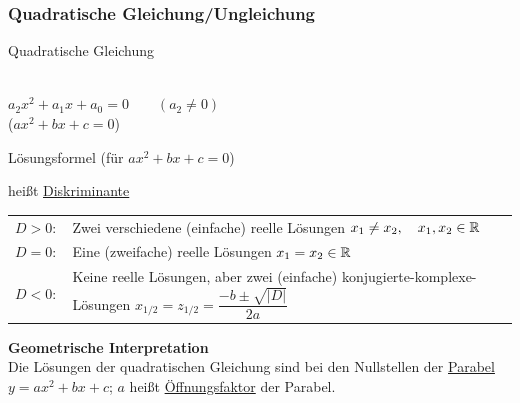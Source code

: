 \subsubsection{Quadratische Gleichung/Ungleichung}
\begin{enumerate}[A)]
	{\bf \item Quadratische Gleichung}\\
	$a_2x^2+a_1x+a_0=0 \qquad(a_2\ne0)$\\
	($ax^2+bx+c=0$)
	
	Lösungsformel (für $ax^2+bx+c=0$)
	
	
	 heißt \ul{Diskriminante}
	
	\vspace{1cm}
	\begin{longtable}{ll}
		\vspace{1cm}
		$D>0:$ & \parbox{\linewidth-3cm}{Zwei verschiedene (einfache) reelle Lösungen\\
			$x_1\ne x_2,\quad x_1,x_2\in\mathbb{R}$} \\
		\vspace{1cm}
		$D=0:$ & \parbox{\linewidth-3cm}{Eine (zweifache) reelle Lösungen\\
			$x_1=x_2\in\mathbb{R}$} \\
		\vspace{1cm}
		$D<0:$ & \parbox{\linewidth-3cm}{Keine reelle Lösungen, aber zwei (einfache)\\
			konjugierte-komplexe-Lösungen\\
			$x_{1/2}=z_{1/2}=\dfrac{-b\pm\sqrt{|D|}}{2a}$} \\
	\end{longtable}
	
	\clearpage
	{\bf Geometrische Interpretation}\\
	Die Lösungen der quadratischen Gleichung sind bei den Nullstellen der \ul{Parabel} $y=ax^2+bx+c$; $a$ heißt \ul{Öffnungsfaktor} der Parabel.
	

\end{enumerate}
